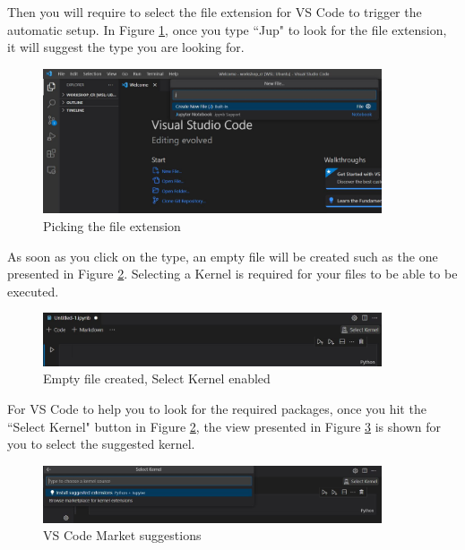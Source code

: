 \documentclass{assignment}
\begin{document}
Then you will require to select the file extension for VS Code to trigger the automatic setup. In Figure \ref{fig:new_file_1}, once you type ``Jup" to look for the file extension, it will suggest the type you are looking for.

\begin{figure}[h]
 \centering 
    \includegraphics[width=10cm]{assets/vs_code_jupyter_notebook.JPG}
    \caption{Picking the file extension}
    \label{fig:new_file_1}
\end{figure}

As soon as you click on the type, an empty file will be created such as the one presented in Figure \ref{fig:new_file_2}. Selecting a Kernel is required for your files to be able to be executed.

\begin{figure}[h]
 \centering 
    \includegraphics[width=10cm]{assets/vs_code_select_kernel.JPG}
    \caption{Empty file created, Select Kernel enabled}
    \label{fig:new_file_2}
\end{figure}

For VS Code to help you to look for the required packages, once you hit the ``Select Kernel" button in Figure \ref{fig:new_file_2}, the view presented in Figure \ref{fig:new_file_3} is shown for you to select the suggested kernel.

\begin{figure}[h]
 \centering 
    \includegraphics[width=10cm]{assets/vs_code_suggested_extensions.JPG}
    \caption{VS Code Market suggestions}
    \label{fig:new_file_3}
\end{figure}

\newpage
\end{document}
